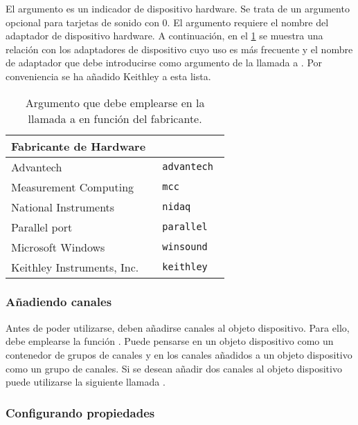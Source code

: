 El argumento  es un indicador de dispositivo hardware. Se trata de un argumento opcional para tarjetas de sonido con  0. El argumento  requiere el nombre del adaptador de dispositivo hardware. A continuación, en el \cref{tab:adaptors} se muestra una relación con los adaptadores de dispositivo cuyo uso es más frecuente y el nombre de adaptador que debe introducirse como argumento de la llamada a . Por conveniencia se ha añadido Keithley a esta lista.

\begin{table}
	\centering
	\begin{tabular}{l >{\tt\qquad}l}
		\toprule
		\multicolumn{1}{c}{Fabricante de Hardware} & \multicolumn{1}{c}{\rm Nombre de adaptador} \\
		\midrule
		Advantech & advantech \\
		\midrule
		Measurement Computing & mcc \\
		\midrule
		National Instruments & nidaq \\
		\midrule
		Parallel port & parallel \\
		\midrule
		Microsoft Windows & winsound \\
		\midrule
		Keithley Instruments, Inc. & keithley \\
		\bottomrule
	\end{tabular}
	\caption[Argumento que debe emplearse en la llamada a  en función del fabricante]{Argumento que debe emplearse en la llamada a  en función del fabricante.}
	\label{tab:adaptors}
\end{table}


\subsubsection{Añadiendo canales}

Antes de poder utilizarse, deben añadirse canales al objeto dispositivo. Para ello, debe emplearse la función . Puede pensarse en un objeto dispositivo como un contenedor de grupos de canales y en los canales añadidos a un objeto dispositivo como un grupo de canales. Si se desean añadir dos canales al objeto dispositivo  puede utilizarse la siguiente llamada .


\subsubsection{Configurando propiedades}

